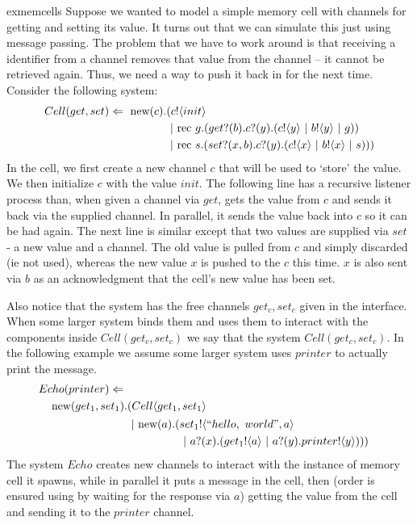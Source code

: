 \begin{example}{exmemcells}
	Suppose we wanted to model a simple memory cell with channels for getting and setting its value.  It turns out that we can simulate this just using message passing.  The problem that we have to work around is that receiving a identifier from a channel removes that value from the channel -- it cannot be retrieved again.  Thus, we need a way to push it back in for the next time.  Consider the following system:
	\begin{equation}\begin{split}
		Cell(get,set) \Leftarrow\  \text{new}({c}). & ({c}!\langle{init}\rangle \\
		& \ |\ \text{rec }{g}.({get}?({b}).{c}?({y}).({c}!\langle{y}\rangle\ |\  {b}!\langle{y}\rangle\ |\  g))\\
		&\ |\ \text{rec }{s}.({set}?({x,b}).{c}?({y}).({c}!\langle{x}\rangle\ |\ {b}!\langle{x}\rangle\ |\  s)))
	\end{split}\end{equation}
	In the cell, we first create a new channel $c$ that will be used to `store' the value.  We then initialize $c$ with the value $init$.  The following line has a recursive listener process than, when given a channel via $get$, gets the value from $c$ and sends it back via the supplied channel.  In parallel, it sends the value back into $c$ so it can be had again.  The next line is similar except that two values are supplied via $set$ - a new value and a channel.  The old value is pulled from $c$ and simply discarded (ie not used), whereas the new value $x$ is pushed to the $c$ this time.  $x$ is also sent via $b$ as an acknowledgment that the cell's new value has been set.
	
	Also notice that the system has the free channels $get_c,set_c$ given in the interface.  When some larger system binds them and uses them to interact with the components inside $Cell(get_c,set_c)$ we say that the system  $Cell(get_c,set_c)$.  In the following example we assume some larger system uses $printer$ to actually print the message.
	\begin{equation}\begin{split}
		Echo(printer) \pdef\\
		\new{get_1,set_1} & (Cell\langle get_1,set_1\rangle\\
		&\begin{split}\comp \new{a}(&\send{set_1}{``hello,\ world",a}\\
		&\comp \receive{a}{x}(\send{get_1}{a}\comp \receive{a}{y}\send{printer}{y})))\end{split}
	\end{split}\end{equation}
	The system $Echo$ creates new channels to interact with the instance of memory cell it spawns, while in parallel it puts a message in the cell, then (order is ensured using by waiting for the response via $a$) getting the value from the cell and sending it to the $printer$ channel.
	

\end{example}

